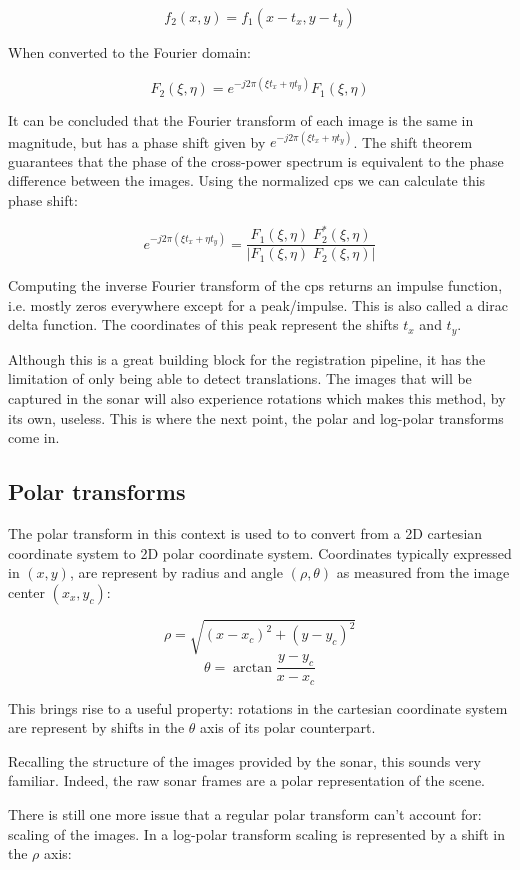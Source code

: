 \[f_2(x,y)=f_1(x-t_x,y-t_y)\]

When converted to the Fourier domain:

\[F_2(\xi,\eta)=e^{-j2\pi(\xi t_x + \eta t_y)} F_1(\xi,\eta)\]

It can be concluded that the Fourier transform of each image is the same in magnitude, but has a phase shift given by \(e^{-j2\pi(\xi t_x + \eta t_y)}\). The shift theorem guarantees that the phase of the cross-power spectrum is equivalent to the phase difference between the images. Using the normalized \acrfull{cps} we can calculate this phase shift:

\[e^{-j2\pi(\xi t_x + \eta t_y)} = \frac{F_1(\xi,\eta) \; F_2^*(\xi,\eta)}{|F_1(\xi,\eta) \; F_2(\xi,\eta)|}\]

Computing the inverse Fourier transform of the \acrshort{cps} returns an impulse function, i.e. mostly zeros everywhere except for a peak/impulse. This is also called a dirac delta function. The coordinates of this peak represent the shifts \(t_x\) and \(t_y\).

Although this is a great building block for the registration pipeline, it has the limitation of only being able to detect translations. The images that will be captured in the sonar will also experience rotations which makes this method, by its own, useless. This is where the next point, the polar and log-polar transforms come in.

\subsection{Polar transforms}

The polar transform in this context is used to to convert from a 2D cartesian coordinate system to 2D polar coordinate system. Coordinates typically expressed in \((x, y)\), are represent by radius and angle \((\rho, \theta)\) as measured from the image center \((x_x, y_c)\):

\[\rho = \sqrt{(x-x_c)^2 + (y - y_c)^2}\]
\[\theta = \arctan{\frac{y - y_c}{x-x_c}}\]

This brings rise to a useful property: rotations in the cartesian coordinate system are represent by shifts in the $\theta$ axis of its polar counterpart.

Recalling the structure of the images provided by the sonar, this sounds very familiar. Indeed, the raw sonar frames are a polar representation of the scene. 

There is still one more issue that a regular polar transform can't account for: scaling of the images. In a log-polar transform scaling is represented by a shift in the $\rho$ axis:

